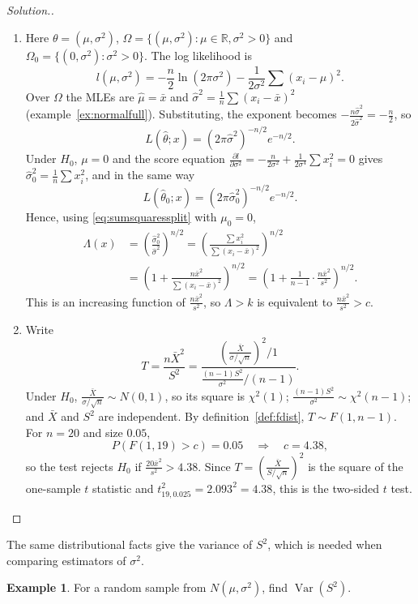 \documentclass[12pt,a4paper]{report}
\theoremstyle{definition}
\newtheorem{example}[thm]{Example}
\theoremstyle{plain}
\newenvironment{solution}
  {\renewcommand{\qedsymbol}{}\begin{proof}[\textit{Solution}.]}
  {\end{proof}}
\begin{document}
\begin{solution}
\begin{enumerate}
\item[(a)] Here $\theta = (\mu,\sigma^2)$, $\Omega = \{(\mu,\sigma^2) : \mu\in\mathbb{R},
\sigma^2>0\}$ and $\Omega_0 = \{(0,\sigma^2) : \sigma^2>0\}$. The log likelihood is
\[l(\mu,\sigma^2) = -\frac n2\ln(2\pi\sigma^2) - \frac{1}{2\sigma^2}\sum(x_i - \mu)^2 .\]
Over $\Omega$ the MLEs are $\hat\mu = \bar x$ and
$\hat\sigma^2 = \frac1n\sum(x_i - \bar x)^2$ (example~\ref{ex:normalfull}).
Substituting, the exponent becomes $-\frac{n\hat\sigma^2}{2\hat\sigma^2} = -\frac n2$,
so
\[L(\hat\theta;x) = (2\pi\hat\sigma^2)^{-n/2}e^{-n/2} .\]
Under $H_0$, $\mu = 0$ and the score equation
$\frac{\partial l}{\partial\sigma^2} = -\frac{n}{2\sigma^2} + \frac{1}{2\sigma^4}\sum x_i^2 = 0$
gives $\hat\sigma_0^2 = \frac1n\sum x_i^2$, and in the same way
\[L(\hat\theta_0;x) = (2\pi\hat\sigma_0^2)^{-n/2}e^{-n/2} .\]
Hence, using \eqref{eq:sumsquaressplit} with $\mu_0 = 0$,
\begin{align*}
\Lambda(x) &= \left(\frac{\hat\sigma_0^2}{\hat\sigma^2}\right)^{n/2}
= \left(\frac{\sum x_i^2}{\sum(x_i - \bar x)^2}\right)^{n/2}\\
&= \left(1 + \frac{n\bar x^2}{\sum(x_i - \bar x)^2}\right)^{n/2}
= \left(1 + \frac{1}{n-1}\cdot\frac{n\bar x^2}{s^2}\right)^{n/2} .
\end{align*}
This is an increasing function of $\frac{n\bar x^2}{s^2}$, so $\Lambda>k$ is
equivalent to $\frac{n\bar x^2}{s^2}>c$.
\item[(b)] Write
\[T = \frac{n\bar X^2}{S^2} = \frac{\left(\frac{\bar X}{\sigma/\sqrt n}\right)^2/1}
{\frac{(n-1)S^2}{\sigma^2}\Big/(n-1)} .\]
Under $H_0$, $\frac{\bar X}{\sigma/\sqrt n}\sim N(0,1)$, so its square is
$\chi^2(1)$; $\frac{(n-1)S^2}{\sigma^2}\sim\chi^2(n-1)$; and $\bar X$ and $S^2$
are independent. By definition~\ref{def:fdist}, $T\sim F(1,n-1)$. For
$n = 20$ and size $0.05$,
\[P(F(1,19)>c) = 0.05\quad\Longrightarrow\quad c = 4.38 ,\]
so the test rejects $H_0$ if $\frac{20\bar x^2}{s^2}>4.38$. Since
$T = \left(\frac{\bar X}{S/\sqrt n}\right)^2$ is the square of the one-sample $t$
statistic and $t_{19,0.025}^2 = 2.093^2 = 4.38$, this is the two-sided $t$ test.
\end{enumerate}
\end{solution}

The same distributional facts give the variance of $S^2$, which is needed when
comparing estimators of $\sigma^2$.

\begin{example}
\label{ex:vars2}
For a random sample from $N(\mu,\sigma^2)$, find $\operatorname{Var}(S^2)$.
\end{example}
\end{document}
